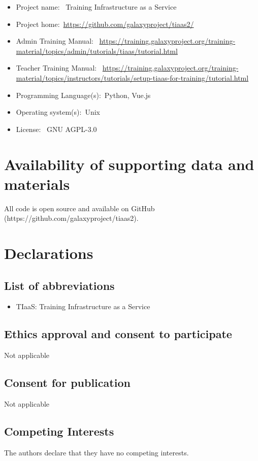 \documentclass[a4paper,num-refs]{oup-contemporary}
\begin{document}
\begin{itemize}
\item Project name: ~Training Infrastructure as a Service
\item Project home:~\url{https://github.com/galaxyproject/tiaas2/}
\item Admin Training Manual: ~\url{https://training.galaxyproject.org/training-material/topics/admin/tutorials/tiaas/tutorial.html}
\item Teacher Training Manual: ~\url{https://training.galaxyproject.org/training-material/topics/instructors/tutorials/setup-tiaas-for-training/tutorial.html}
\item Programming Language(s):~Python, Vue.js 
\item Operating system(s):~Unix
\item License: ~GNU AGPL-3.0
\end{itemize}

\section{Availability of supporting data and materials}
All code is open source and available on GitHub (https://github.com/galaxyproject/tiaas2).

\section{Declarations}

\subsection{List of abbreviations}
\begin{itemize}
\item TIaaS: Training Infrastructure as a Service
\end{itemize}

\subsection{Ethics approval and consent to participate}
Not applicable

\subsection{Consent for publication}
Not applicable

\subsection{Competing Interests}
The authors declare that they have no competing interests.
\end{document}
